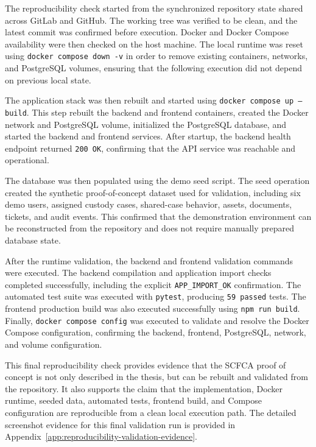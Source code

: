 \documentclass[12pt,a4paper]{report}
\begin{document}
The reproducibility check started from the synchronized repository state shared across GitLab and GitHub. The working tree was verified to be clean, and the latest commit was confirmed before execution. Docker and Docker Compose availability were then checked on the host machine. The local runtime was reset using \texttt{docker compose down -v} in order to remove existing containers, networks, and PostgreSQL volumes, ensuring that the following execution did not depend on previous local state.

The application stack was then rebuilt and started using \texttt{docker compose up --build}. This step rebuilt the backend and frontend containers, created the Docker network and PostgreSQL volume, initialized the PostgreSQL database, and started the backend and frontend services. After startup, the backend health endpoint returned \texttt{200 OK}, confirming that the API service was reachable and operational.

The database was then populated using the demo seed script. The seed operation created the synthetic proof-of-concept dataset used for validation, including six demo users, assigned custody cases, shared-case behavior, assets, documents, tickets, and audit events. This confirmed that the demonstration environment can be reconstructed from the repository and does not require manually prepared database state.

After the runtime validation, the backend and frontend validation commands were executed. The backend compilation and application import checks completed successfully, including the explicit \texttt{APP\_IMPORT\_OK} confirmation. The automated test suite was executed with \texttt{pytest}, producing \texttt{59 passed} tests. The frontend production build was also executed successfully using \texttt{npm run build}. Finally, \texttt{docker compose config} was executed to validate and resolve the Docker Compose configuration, confirming the backend, frontend, PostgreSQL, network, and volume configuration.

This final reproducibility check provides evidence that the SCFCA proof of concept is not only described in the thesis, but can be rebuilt and validated from the repository. It also supports the claim that the implementation, Docker runtime, seeded data, automated tests, frontend build, and Compose configuration are reproducible from a clean local execution path. The detailed screenshot evidence for this final validation run is provided in Appendix~\ref{app:reproducibility-validation-evidence}.
\end{document}
